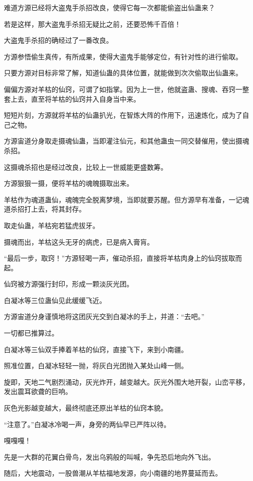 \begin{this_body}
难道方源已经将大盗鬼手杀招改良，使得它每一次都能偷盗出仙蛊来？

若是这样，那大盗鬼手杀招无疑比之前，还要恐怖千百倍！

大盗鬼手杀招的确经过了一番改良。

方源参悟偷生真传，有所成果，使得大盗鬼手能够定位，有针对性的进行偷取。

只要方源对目标非常了解，知道仙蛊的具体位置，就能做到次次偷取出仙蛊来。

偏偏方源对羊枯的仙窍，可谓了如指掌。因为上一世，他就盗蛊、搜魂、吞窍一整套上去，直至将羊枯的仙窍并入自身当中来。

短短片刻，方源就将羊枯的仙蛊扒光，在智炼大阵的作用下，迅速炼化，成为了自己之物。

方源宙道分身取走摄魂仙蛊，当即灌注仙元，和其他蛊虫一同交替催用，使出摄魂杀招。

这摄魂杀招也是经过改良，比较上一世威能更盛数筹。

方源狠狠一摄，便将羊枯的魂魄摄取出来。

羊枯作为魂道蛊仙，魂魄完全脱离梦境，当即就要苏醒。但方源早有准备，一记魂道杀招打上去，将其封存。

取走仙蛊，羊枯宛若猛虎拔牙。

摄魂而出，羊枯这头无牙的病虎，已是病入膏肓。

“最后一步，取窍！”方源轻喝一声，催动杀招，直接将羊枯肉身上的仙窍拔取而起。

仙窍被方源强行封印，形成一颗淡灰光团。

白凝冰等三位蛊仙见此缓缓飞近。

方源宙道分身谨慎地将这团灰光交到白凝冰的手上，并道：“去吧。”

一切都已推算过。

白凝冰等三仙双手捧着羊枯的仙窍，直接飞下，来到小南疆。

照准位置，白凝冰轻轻一抛，将灰白光团抛入某处山峰一侧。

旋即，天地二气剧烈涌动，灰光炸开，越变越大。灰光外围大地开裂，山峦平移，发出震耳欲聋的巨响。

灰色光影越变越大，最终彻底还原出羊枯的仙窍本貌。

“注意了。”白凝冰冷喝一声，身旁的两仙早已严阵以待。

嘎嘎嘎！

先是一大群的花翼白骨鸟，发出乌鸦般的叫喊，争先恐后地向外飞出。

随后，大地震动，一股兽潮从羊枯福地发源，向小南疆的地界蔓延而去。


\end{this_body}
